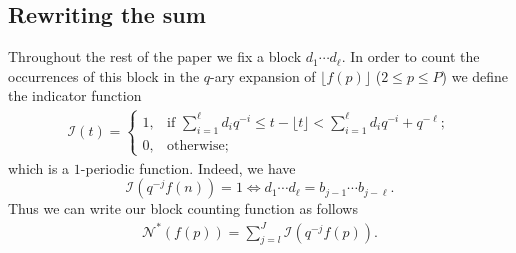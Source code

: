 \documentclass[a4paper,10pt]{amsart}
\numberwithin{equation}{section}
\theoremstyle{definition}
\theoremstyle{remark}
\begin{document}
\subsection{Rewriting the sum}\label{sec:rewriting-sum}
Throughout the rest of the paper we fix a block $d_1\cdots d_\ell$. In order to
count the occurrences of this block in the $q$-ary expansion of $\lfloor f(p)
\rfloor$ ($2\le p \le P$)  we define the indicator function
\begin{align}\label{mani:I}
\mathcal{I}(t)=\begin{cases}
  1, &\text{if }\sum_{i=1}^\ell d_iq^{-i}\leq t-\lfloor t\rfloor
     <\sum_{i=1}^\ell d_iq^{-i}+q^{-\ell};\\
  0, &\text{otherwise;}
     \end{cases}
\end{align}
which is a $1$-periodic function. Indeed, we have
\[
\mathcal{I}(q^{-j}f(n)) = 1 \Longleftrightarrow d_1\cdots d_\ell =
b_{j-1}\cdots b_{j-\ell}.
\]
Thus we can write our block counting function as follows
\begin{gather}\label{mani:NthetatoNstar}
\mathcal{N}^*(f(p))=\sum_{j=l}^J\mathcal{I}\left(q^{-j}f(p)\right).
\end{gather}

\end{document}
